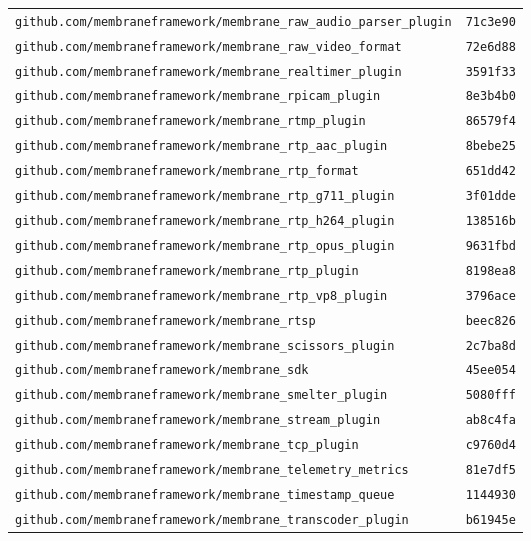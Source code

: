 \begin{longtable}{@{}p{} l@{}}
\texttt{github.com/membraneframework/membrane\_raw\_audio\_parser\_plugin} & \texttt{71c3e90} \\
\texttt{github.com/membraneframework/membrane\_raw\_video\_format} & \texttt{72e6d88} \\
\texttt{github.com/membraneframework/membrane\_realtimer\_plugin} & \texttt{3591f33} \\
\texttt{github.com/membraneframework/membrane\_rpicam\_plugin} & \texttt{8e3b4b0} \\
\texttt{github.com/membraneframework/membrane\_rtmp\_plugin} & \texttt{86579f4} \\
\texttt{github.com/membraneframework/membrane\_rtp\_aac\_plugin} & \texttt{8bebe25} \\
\texttt{github.com/membraneframework/membrane\_rtp\_format} & \texttt{651dd42} \\
\texttt{github.com/membraneframework/membrane\_rtp\_g711\_plugin} & \texttt{3f01dde} \\
\texttt{github.com/membraneframework/membrane\_rtp\_h264\_plugin} & \texttt{138516b} \\
\texttt{github.com/membraneframework/membrane\_rtp\_opus\_plugin} & \texttt{9631fbd} \\
\texttt{github.com/membraneframework/membrane\_rtp\_plugin} & \texttt{8198ea8} \\
\texttt{github.com/membraneframework/membrane\_rtp\_vp8\_plugin} & \texttt{3796ace} \\
\texttt{github.com/membraneframework/membrane\_rtsp} & \texttt{beec826} \\
\texttt{github.com/membraneframework/membrane\_scissors\_plugin} & \texttt{2c7ba8d} \\
\texttt{github.com/membraneframework/membrane\_sdk} & \texttt{45ee054} \\
\texttt{github.com/membraneframework/membrane\_smelter\_plugin} & \texttt{5080fff} \\
\texttt{github.com/membraneframework/membrane\_stream\_plugin} & \texttt{ab8c4fa} \\
\texttt{github.com/membraneframework/membrane\_tcp\_plugin} & \texttt{c9760d4} \\
\texttt{github.com/membraneframework/membrane\_telemetry\_metrics} & \texttt{81e7df5} \\
\texttt{github.com/membraneframework/membrane\_timestamp\_queue} & \texttt{1144930} \\
\texttt{github.com/membraneframework/membrane\_transcoder\_plugin} & \texttt{b61945e} \\

\end{longtable}
